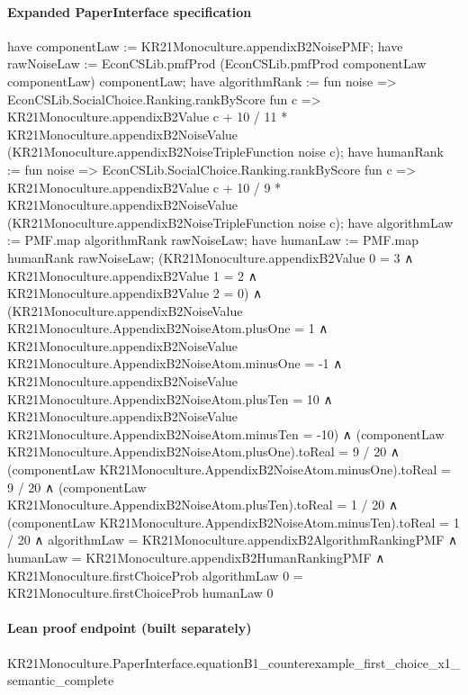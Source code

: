 \documentclass[10pt]{article}
\begin{document}
\paragraph{Expanded PaperInterface specification}
\begin{ReviewVerbatim}
have componentLaw := KR21Monoculture.appendixB2NoisePMF;
have rawNoiseLaw := EconCSLib.pmfProd (EconCSLib.pmfProd componentLaw componentLaw) componentLaw;
have algorithmRank := fun noise =>
  EconCSLib.SocialChoice.Ranking.rankByScore fun c =>
    KR21Monoculture.appendixB2Value c +
      10 / 11 * KR21Monoculture.appendixB2NoiseValue (KR21Monoculture.appendixB2NoiseTripleFunction noise c);
have humanRank := fun noise =>
  EconCSLib.SocialChoice.Ranking.rankByScore fun c =>
    KR21Monoculture.appendixB2Value c +
      10 / 9 * KR21Monoculture.appendixB2NoiseValue (KR21Monoculture.appendixB2NoiseTripleFunction noise c);
have algorithmLaw := PMF.map algorithmRank rawNoiseLaw;
have humanLaw := PMF.map humanRank rawNoiseLaw;
(KR21Monoculture.appendixB2Value 0 = 3 ∧
    KR21Monoculture.appendixB2Value 1 = 2 ∧ KR21Monoculture.appendixB2Value 2 = 0) ∧
  (KR21Monoculture.appendixB2NoiseValue KR21Monoculture.AppendixB2NoiseAtom.plusOne = 1 ∧
      KR21Monoculture.appendixB2NoiseValue KR21Monoculture.AppendixB2NoiseAtom.minusOne = -1 ∧
        KR21Monoculture.appendixB2NoiseValue KR21Monoculture.AppendixB2NoiseAtom.plusTen = 10 ∧
          KR21Monoculture.appendixB2NoiseValue KR21Monoculture.AppendixB2NoiseAtom.minusTen = -10) ∧
    (componentLaw KR21Monoculture.AppendixB2NoiseAtom.plusOne).toReal = 9 / 20 ∧
      (componentLaw KR21Monoculture.AppendixB2NoiseAtom.minusOne).toReal = 9 / 20 ∧
        (componentLaw KR21Monoculture.AppendixB2NoiseAtom.plusTen).toReal = 1 / 20 ∧
          (componentLaw KR21Monoculture.AppendixB2NoiseAtom.minusTen).toReal = 1 / 20 ∧
            algorithmLaw = KR21Monoculture.appendixB2AlgorithmRankingPMF ∧
              humanLaw = KR21Monoculture.appendixB2HumanRankingPMF ∧
                KR21Monoculture.firstChoiceProb algorithmLaw 0 = KR21Monoculture.firstChoiceProb humanLaw 0
\end{ReviewVerbatim}

\paragraph{Lean proof endpoint (built separately)}\begin{ReviewVerbatim}
KR21Monoculture.PaperInterface.equationB1_counterexample_first_choice_x1_semantic_complete
\end{ReviewVerbatim}
\end{document}

